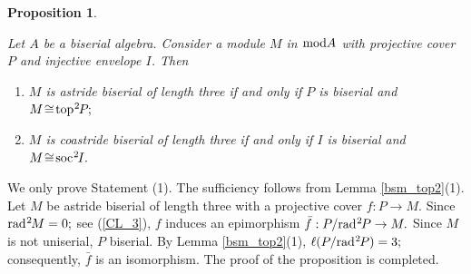 \documentclass[10pt]{amsart}
\newtheorem{Prop}[Theo]{Proposition}
\theoremstyle{definition}
\newcommand{\mmod}{{\rm mod}}
\newcommand{\rad}{{\rm rad}\hspace{.5pt}}
\newcommand{\soc}{{\rm soc}\hspace{.5pt}}
\newcommand{\ntop}{{\rm top}\hspace{.5pt}}
\begin{document}
\begin{Prop}\label{bsa_ml3}

Let $A$ be a biserial algebra. Consider a module $M$ in $\mmod A$ with projective cover $P$ and injective envelope $I$. Then

\begin{enumerate}[$(1)$]

\vspace{-1.5pt}

\item $M$ is astride biserial of length three if and only if $P$ is biserial and $M \!\cong \! \ntop^2\hspace{-1pt}P\hspace{-.5pt};$

\vspace{1pt}

\item $M$ is coastride biserial of length three if and only if $I$ is biserial and $M \!\cong \!\soc^2\hspace{-1pt}I.$

\end{enumerate}\end{Prop}

\vspace{-1.5pt}

 We only prove Statement (1). The sufficiency follows from Lemma \ref{bsm_top2}(1). Let $M$ be astride biserial of length three with a projective cover $f: P\to M.$ Since $\rad^2\hspace{-1pt}M=0;$ see (\ref{CL_3}), $f$ induces an epimorphism $\bar f: P / \rad^2\hspace{-1pt}P \to M.$ Since $M$ is not uniserial, $P$ biserial. By Lemma \ref{bsm_top2}(1), 
$\ell(P/\rad^2\hspace{-1pt}P)=3;$ consequently, $\bar f$ is an isomorphism. 
The proof of the proposition is completed.  
\end{document}
